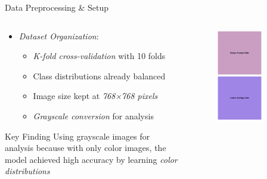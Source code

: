 \documentclass[aspectratio=169,8pt]{beamer}  %
\begin{document}
\begin{frame}{Data Preprocessing \& Setup}
\begin{columns}[T]
\begin{column}{0.6\textwidth}
\begin{itemize}
\item \emph{Dataset Organization}:
  \begin{itemize}
  \item \emph{K-fold cross-validation} with 10 folds
  \item Class distributions already balanced
  \item Image size kept at \emph{768×768 pixels}
  \item \emph{Grayscale conversion} for analysis
  \end{itemize}
\end{itemize}

\begin{alertblock}{Key Finding}
Using grayscale images for analysis because with only color images, the model achieved high accuracy by learning \emph{color distributions}
\end{alertblock}
\end{column}
\begin{column}{0.4\textwidth}
\begin{figure}
\includegraphics[width=0.7\textwidth, height=0.70\textheight]{imgs/class_avg_colors.png}
\end{figure}
\end{column}
\end{columns}
\end{frame}
\end{document}
